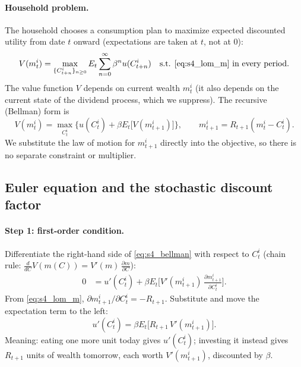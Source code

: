 \paragraph{Household problem.}
The household chooses a consumption plan to maximize expected discounted utility from date $t$ onward (expectations are taken at $t$, not at $0$):
\begin{equation}\label{eq:s4_seq}
  V(m^i_t) = \max_{\{C^i_{t+n}\}_{n\ge0}} E_t\sum_{n=0}^{\infty}\beta^n u(C^i_{t+n})
  \quad\text{s.t. \eqref{eq:s4_lom_m} in every period.}
\end{equation}
The value function $V$ depends on current wealth $m^i_t$ (it also depends on the current state of the dividend process, which we suppress). The recursive (Bellman) form is
\begin{equation}\label{eq:s4_bellman}
  V(m^i_t) = \max_{C^i_t}\Big\{u(C^i_t) + \beta E_t\big[V(m^i_{t+1})\big]\Big\},
  \qquad m^i_{t+1} = R_{t+1}(m^i_t - C^i_t).
\end{equation}
We substitute the law of motion for $m^i_{t+1}$ directly into the objective, so there is no separate constraint or multiplier.

\subsection{Euler equation and the stochastic discount factor }

\paragraph{Step 1: first-order condition.}
Differentiate the right-hand side of \eqref{eq:s4_bellman} with respect to $C^i_t$ (chain rule: $\frac{d}{dC}V(m(C)) = V'(m)\,\frac{\partial m}{\partial C}$):
\begin{align*}
  0 &= u'(C^i_t) + \beta E_t\Big[V'(m^i_{t+1})\,\frac{\partial m^i_{t+1}}{\partial C^i_t}\Big].
\end{align*}
From \eqref{eq:s4_lom_m}, $\partial m^i_{t+1}/\partial C^i_t = -R_{t+1}$. Substitute and move the expectation term to the left:
\begin{equation}\label{eq:s4_foc}
  u'(C^i_t) = \beta E_t\big[R_{t+1}\,V'(m^i_{t+1})\big].
\end{equation}
Meaning: eating one more unit today gives $u'(C^i_t)$; investing it instead gives $R_{t+1}$ units of wealth tomorrow, each worth $V'(m^i_{t+1})$, discounted by $\beta$.

